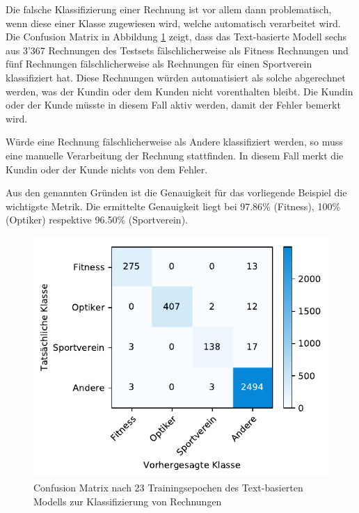 Die falsche Klassifizierung einer Rechnung ist vor allem dann problematisch, wenn diese einer Klasse zugewiesen wird, welche automatisch verarbeitet wird. Die Confusion Matrix in Abbildung \ref{text-classification-cm} zeigt, dass das Text-basierte Modell sechs aus 3'367 Rechnungen des Testsets fälschlicherweise als Fitness Rechnungen und fünf Rechnungen fälschlicherweise als Rechnungen für einen Sportverein klassifiziert hat. Diese Rechnungen würden automatisiert als solche abgerechnet werden, was der Kundin oder dem Kunden nicht vorenthalten bleibt. Die Kundin oder der Kunde müsste in diesem Fall aktiv werden, damit der Fehler bemerkt wird.

Würde eine Rechnung fälschlicherweise als Andere klassifiziert werden, so muss eine manuelle Verarbeitung der Rechnung stattfinden. In diesem Fall merkt die Kundin oder der Kunde nichts von dem Fehler. 

Aus den genannten Gründen ist die Genauigkeit für das vorliegende Beispiel die wichtigste Metrik. Die ermittelte Genauigkeit liegt bei 97.86\% (Fitness), 100\% (Optiker) respektive 96.50\% (Sportverein).

\begin{figure}[h!] 
    \captionsetup{width=.9\linewidth}
    \caption{Confusion Matrix nach 23 Trainingsepochen des Text-basierten Modells zur Klassifizierung von Rechnungen}
    \label{text-classification-cm}
    \centering
    \includegraphics[scale=1]{graphics/matplot/textual-class__cm_22.pdf}
\end{figure}

